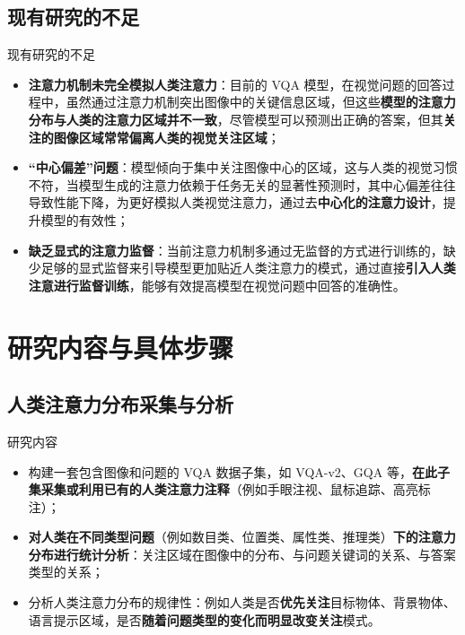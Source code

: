 \documentclass{beamer}
\begin{document}
\subsection{现有研究的不足}

\begin{frame}{现有研究的不足}
    \vspace*{-0.5em}
    \begin{itemize}
        \item \textcolor{deepred}{\textbf{注意力机制未完全模拟人类注意力}}：目前的 VQA 模型，在视觉问题的回答过程中，虽然通过注意力机制突出图像中的关键信息区域，但这些\textcolor{deepred}{\textbf{模型的注意力分布与人类的注意力区域并不一致}}，尽管模型可以预测出正确的答案，但其\textcolor{deepred}{\textbf{关注的图像区域常常偏离人类的视觉关注区域}}；
        \item \textcolor{deepred}{\textbf{“中心偏差”问题}}：模型倾向于集中关注图像中心的区域，这与人类的视觉习惯不符，当模型生成的注意力依赖于任务无关的显著性预测时，其中心偏差往往导致性能下降，为更好模拟人类视觉注意力，通过去\textcolor{deepred}{\textbf{中心化的注意力设计}}，提升模型的有效性；
        \item \textcolor{deepred}{\textbf{缺乏显式的注意力监督}}：当前注意力机制多通过无监督的方式进行训练的，缺少足够的显式监督来引导模型更加贴近人类注意力的模式，通过直接\textcolor{deepred}{\textbf{引入人类注意进行监督训练}}，能够有效提高模型在视觉问题中回答的准确性。
    \end{itemize}
\end{frame}



\section{研究内容与具体步骤}
\subsection{人类注意力分布采集与分析}

\begin{frame}{研究内容}
    \begin{itemize}
        \item 构建一套包含图像和问题的 VQA 数据子集，如 VQA-v2、GQA 等，\textcolor{deepred}{\textbf{在此子集采集或利用已有的人类注意力注释}}（例如手眼注视、鼠标追踪、高亮标注）；
        \item \textcolor{deepred}{\textbf{对人类在不同类型问题}}（例如数目类、位置类、属性类、推理类）\textcolor{deepred}{\textbf{下的注意力分布进行统计分析}}：关注区域在图像中的分布、与问题关键词的关系、与答案类型的关系；
        \item 分析人类注意力分布的规律性：例如人类是否\textcolor{deepred}{\textbf{优先关注}}目标物体、背景物体、语言提示区域，是否\textcolor{deepred}{\textbf{随着问题类型的变化而明显改变关注}}模式。
    \end{itemize}
\end{frame}
\end{document}
